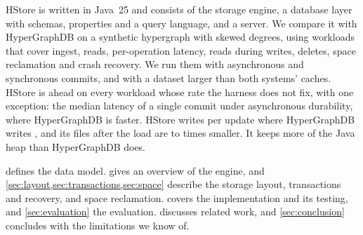 HStore is written in Java~25 and consists of the storage engine, a database layer with schemas, properties and a query language, and a server. We compare it with HyperGraphDB on a synthetic hypergraph with skewed degrees, using  workloads that cover ingest, reads, per-operation latency, reads during writes, deletes, space reclamation and crash recovery. We run them with asynchronous and synchronous commits, and with a dataset larger than both systems' caches. HStore is ahead on every workload whose rate the harness does not fix, with one exception: the median latency of a single commit under asynchronous durability, where HyperGraphDB is faster. HStore writes  per update where HyperGraphDB writes , and its files after the load are  to  times smaller. It keeps more of the Java heap than HyperGraphDB does.

 defines the data model.  gives an overview of the engine, and \cref{sec:layout,sec:transactions,sec:space} describe the storage layout, transactions and recovery, and space reclamation.  covers the implementation and its testing, and \cref{sec:evaluation} the evaluation.  discusses related work, and \cref{sec:conclusion} concludes with the limitations we know of.

